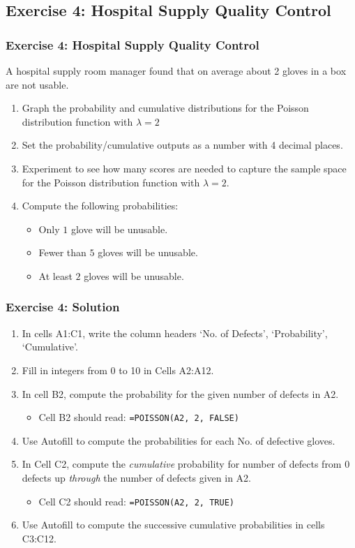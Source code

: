 \documentclass[12pt]{beamer}
\begin{document}
\subsection{Exercise 4: Hospital Supply Quality Control}
	\begin{frame}
		\frametitle{Exercise 4: Hospital Supply Quality Control}
		A hospital supply room manager found that on average about 2 gloves in a box are not usable.
		 
		\begin{enumerate}
			\item Graph the probability and cumulative distributions for the Poisson distribution function with $\lambda = 2$ 
			\item Set the probability/cumulative outputs as a number with 4 decimal places.
			\item Experiment to see how many scores are needed to capture the sample space for the Poisson distribution function with $\lambda=2$. 
			\item Compute the following probabilities:
				\begin{itemize}
					\item Only $1$ glove will be unusable.
					\item Fewer than $5$ gloves will be unusable.
					\item At least $2$ gloves will be unusable.
				\end{itemize}
		\end{enumerate}
	\end{frame}
	\begin{frame}
		\frametitle{Exercise 4: Solution}
		\begin{enumerate}
			\item In cells A1:C1, write the column headers `No. of Defects', `Probability', `Cumulative'. 
			\item Fill in integers from 0 to 10 in Cells A2:A12.
			\item In cell B2, compute the probability for the given number of defects in A2. 
			\begin{itemize}
				\item Cell B2 should read: \texttt{=POISSON(A2, 2, FALSE)}
			\end{itemize}
			\item Use Autofill to compute the probabilities for each No. of defective gloves.
			\item In Cell C2, compute the \textit{cumulative} probability for number of defects from 0 defects up \textit{through} the number of defects given in A2.
			\begin{itemize}
				\item Cell C2 should read: \texttt{=POISSON(A2, 2, TRUE)} 
			\end{itemize}
			\item Use Autofill to compute the successive cumulative probabilities in cells C3:C12.
		\end{enumerate}
	\end{frame}
\end{document}
